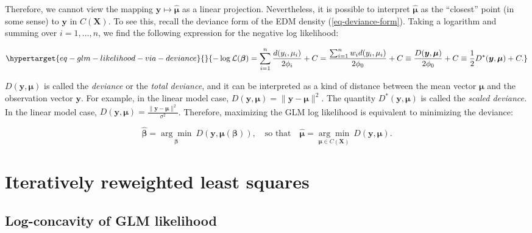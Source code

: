 \documentclass[
  11pt,
  letterpaper,
  oneside]{book}
\theoremstyle{plain}
\theoremstyle{plain}
\theoremstyle{definition}
\theoremstyle{definition}
\theoremstyle{plain}
\theoremstyle{remark}
\begin{document}
Therefore, we cannot view the mapping
\(\boldsymbol{y} \mapsto \boldsymbol{\widehat \mu}\) as a linear
projection. Nevertheless, it is possible to interpret
\(\boldsymbol{\widehat \mu}\) as the ``closest'' point (in some sense)
to \(\boldsymbol{y}\) in \(C(\boldsymbol{X})\). To see this, recall the
deviance form of the EDM density (\ref{eq-deviance-form}). Taking a
logarithm and summing over \(i = 1, \dots, n\), we find the following
expression for the negative log likelihood:

\begin{equation}\protect\hypertarget{eq-glm-likelihood-via-deviance}{}{
-\log \mathcal L(\boldsymbol{\beta}) = \sum_{i = 1}^n \frac{d(y_i, \mu_i)}{2\phi_i} + C = \frac{\sum_{i = 1}^n w_id(y_i, \mu_i)}{2\phi_0} + C  \equiv \frac{D(\boldsymbol{y}, \boldsymbol{\mu})}{2\phi_0} + C \equiv \frac12 D^*(\boldsymbol{y}, \boldsymbol{\mu}) + C.
}\label{eq-glm-likelihood-via-deviance}\end{equation}

\(D(\boldsymbol{y}, \boldsymbol{\mu})\) is called the \emph{deviance} or
the \emph{total deviance}, and it can be interpreted as a kind of
distance between the mean vector \(\boldsymbol{\mu}\) and the
observation vector \(\boldsymbol{y}\). For example, in the linear model
case,
\(D(\boldsymbol{y}, \boldsymbol{\mu}) = \|\boldsymbol{y} - \boldsymbol{\mu}\|^2\).
The quantity \(D^*(\boldsymbol{y}, \boldsymbol{\mu})\) is called the
\emph{scaled deviance.} In the linear model case,
\(D(\boldsymbol{y}, \boldsymbol{\mu}) = \frac{\|\boldsymbol{y} - \boldsymbol{\mu}\|^2}{\sigma^2}\).
Therefore, maximizing the GLM log likelihood is equivalent to minimizing
the deviance:

\[
\boldsymbol{\widehat \beta} = \underset{\boldsymbol{\beta}}{\arg \min}\ D(\boldsymbol{y}, \boldsymbol{\mu}(\boldsymbol{\beta})), \quad \text{so that} \quad \boldsymbol{\widehat \mu} = \underset{\boldsymbol{\mu} \in C(\boldsymbol{X})}{\arg \min}\ D(\boldsymbol{y}, \boldsymbol{\mu}).
\]

\hypertarget{sec-irls}{%
\section{Iteratively reweighted least squares}\label{sec-irls}}

\hypertarget{log-concavity-of-glm-likelihood}{%
\subsection{Log-concavity of GLM
likelihood}\label{log-concavity-of-glm-likelihood}}
\end{document}

